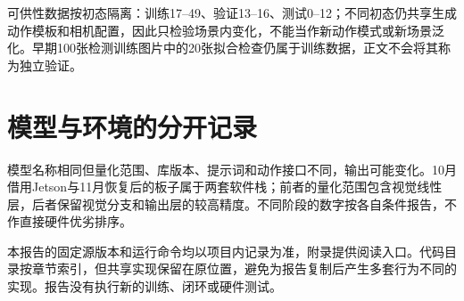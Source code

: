 可供性数据按初态隔离：训练17--49、验证13--16、测试0--12；不同初态仍共享生成动作模板和相机配置，因此只检验场景内变化，不能当作新动作模式或新场景泛化。早期100张检测训练图片中的20张拟合检查仍属于训练数据，正文不会将其称为独立验证。
\section{模型与环境的分开记录}
模型名称相同但量化范围、库版本、提示词和动作接口不同，输出可能变化。10月借用Jetson与11月恢复后的板子属于两套软件栈；前者的量化范围包含视觉线性层，后者保留视觉分支和输出层的较高精度。不同阶段的数字按各自条件报告，不作直接硬件优劣排序。

本报告的固定源版本和运行命令均以项目内记录为准，附录提供阅读入口。代码目录按章节索引，但共享实现保留在原位置，避免为报告复制后产生多套行为不同的实现。报告没有执行新的训练、闭环或硬件测试。

